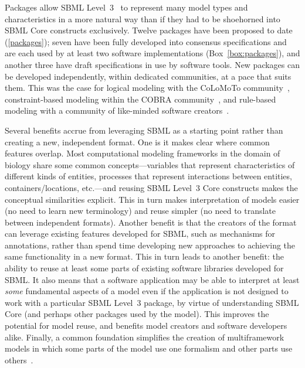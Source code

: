 \documentclass{sbml-paper}
\begin{document}
Packages allow SBML Level~3~\citep{Hucka2019systems} to represent many model types and characteristics in a more natural way than if they had to be shoehorned into SBML Core constructs exclusively.  Twelve packages have been proposed to date (\autoref{packages}); seven have been fully developed into consensus specifications and are each used by at least two software implementations (Box~\ref{box:packages}), and another three have draft specifications in use by software tools.  New packages can be developed independently, within dedicated communities, at a pace that suits them.  This was the case for logical modeling with the CoLoMoTo community~\citep{naldi2015cooperative}, constraint-based modeling within the COBRA community~\citep{Ebrahim2015}, and rule-based modeling with a community of like-minded software creators~\citep{Blinov2004, Palmisano2014multistate, zhang2013simmune}.

Several benefits accrue from leveraging SBML as a starting point rather than creating a new, independent format.  One is it makes clear where common features overlap.  Most computational modeling frameworks in the domain of biology share some common concepts---variables that represent characteristics of different kinds of entities, processes that represent interactions between entities, containers/locations, etc.---and reusing SBML Level~3 Core constructs makes the conceptual similarities explicit.  This in turn makes interpretation of models easier (no need to learn new terminology) and reuse simpler (no need to translate between independent formats).  Another benefit is that the creators of the format can leverage existing features developed for SBML, such as mechanisms for annotations, rather than spend time developing new approaches to achieving the same functionality in a new format.  This in turn leads to another benefit: the ability to reuse at least some parts of existing software libraries developed for SBML.  It also means that a software application may be able to interpret at least \emph{some} fundamental aspects of a model even if the application is not designed to work with a particular SBML Level~3 package, by virtue of understanding SBML Core (and perhaps other packages used by the model).  This improves the potential for model reuse, and benefits model creators and software developers alike.  Finally, a common foundation simplifies the creation of multiframework models in which some parts of the model use one formalism and other parts use others~\citep[e.g., coupling kinetic models with flux-balance analysis;][]{Watanabe2018dynamic}.
\end{document}
